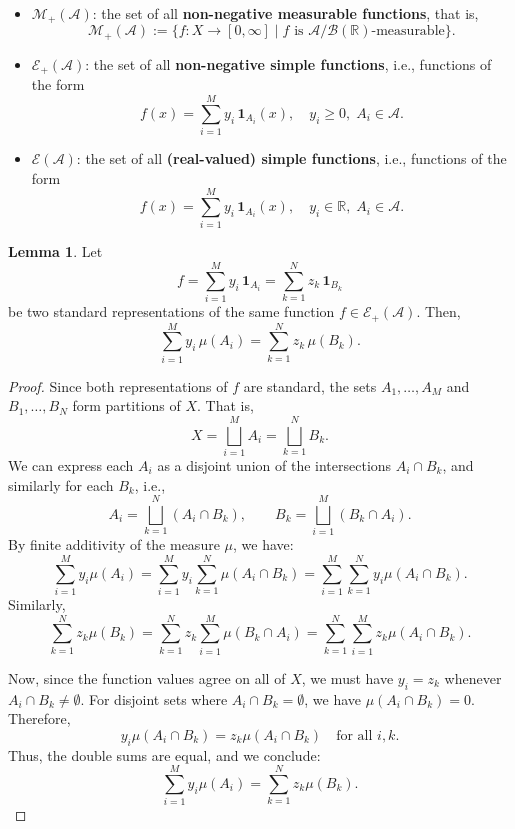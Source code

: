 \documentclass[12pt]{article}
\theoremstyle{definition}
\newtheorem{lemma}[theorem]{Lemma}
\begin{document}
\begin{itemize}
  \item \( \mathcal{M}_+(\mathcal{A}) \): the set of all \textbf{non-negative measurable functions}, that is,
  \[
  \mathcal{M}_+(\mathcal{A}) := \{ f : X \to [0, \infty] \mid f \text{ is } \mathcal{A}/\mathcal{B}({\mathbb{R}})\text{-measurable} \}.
  \]
  
  \item \( \mathcal{E}_+(\mathcal{A}) \): the set of all \textbf{non-negative simple functions}, i.e., functions of the form
  \[
  f(x) = \sum_{i=1}^M y_i \, \mathbf{1}_{A_i}(x), \quad y_i \geq 0, \; A_i \in \mathcal{A}.
  \]
  
  \item \( \mathcal{E}(\mathcal{A}) \): the set of all \textbf{(real-valued) simple functions}, i.e., functions of the form
  \[
  f(x) = \sum_{i=1}^M y_i \, \mathbf{1}_{A_i}(x), \quad y_i \in \mathbb{R}, \; A_i \in \mathcal{A}.
  \]
\end{itemize}

\medskip
\begin{lemma}
Let
\[
f = \sum_{i=1}^{M} y_i \, \mathbf{1}_{A_i} = \sum_{k=1}^{N} z_k \, \mathbf{1}_{B_k}
\]
be two standard representations of the same function \( f \in \mathcal{E}_+(\mathcal{A}) \). Then,
\[
\sum_{i=1}^{M} y_i \, \mu(A_i) = \sum_{k=1}^{N} z_k \, \mu(B_k).
\]
\end{lemma}

\begin{proof}
Since both representations of \( f \) are standard, the sets \( A_1, \dots, A_M \) and \( B_1, \dots, B_N \) form partitions of \( X \). That is,
\[
X = \bigsqcup_{i=1}^{M} A_i = \bigsqcup_{k=1}^{N} B_k.
\]
We can express each \( A_i \) as a disjoint union of the intersections \( A_i \cap B_k \), and similarly for each \( B_k \), i.e.,
\[
A_i = \bigsqcup_{k=1}^{N} (A_i \cap B_k), \qquad B_k = \bigsqcup_{i=1}^{M} (B_k \cap A_i).
\]
By finite additivity of the measure \( \mu \), we have:
\[
\sum_{i=1}^{M} y_i \mu(A_i)
= \sum_{i=1}^{M} y_i \sum_{k=1}^{N} \mu(A_i \cap B_k)
= \sum_{i=1}^{M} \sum_{k=1}^{N} y_i \mu(A_i \cap B_k).
\]
Similarly,
\[
\sum_{k=1}^{N} z_k \mu(B_k)
= \sum_{k=1}^{N} z_k \sum_{i=1}^{M} \mu(B_k \cap A_i)
= \sum_{k=1}^{N} \sum_{i=1}^{M} z_k \mu(A_i \cap B_k).
\]

Now, since the function values agree on all of \( X \), we must have \( y_i = z_k \) whenever \( A_i \cap B_k \neq \emptyset \). For disjoint sets where \( A_i \cap B_k = \emptyset \), we have \( \mu(A_i \cap B_k) = 0 \). Therefore,
\[
y_i \mu(A_i \cap B_k) = z_k \mu(A_i \cap B_k) \quad \text{for all } i, k.
\]
Thus, the double sums are equal, and we conclude:
\[
\sum_{i=1}^{M} y_i \mu(A_i) = \sum_{k=1}^{N} z_k \mu(B_k).
\]
\end{proof}
\end{document}
